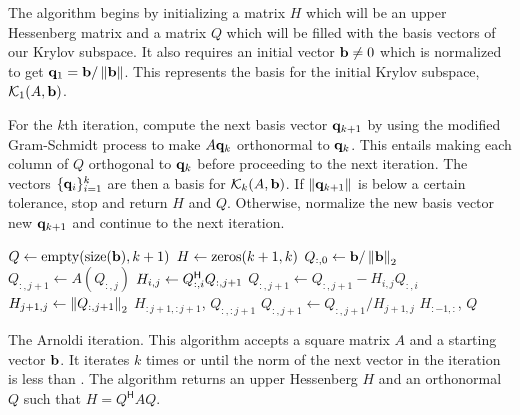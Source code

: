 The algorithm begins by initializing a matrix $H$ which will be an upper Hessenberg matrix and a matrix $Q$ which will be filled with the basis vectors of our Krylov subspace.
It also requires an initial vector $\mathbf{b} \neq 0$ which is normalized to get $\mathbf{q}_1 = \mathbf{b}/\left\lVert\mathbf{b}\right\rVert$.
This represents the basis for the initial Krylov subspace, $\mathcal{K}_1(A,\mathbf{b})$.

For the $k$th iteration, compute the next basis vector $\mathbf{q}_{k+1}$ by using the modified Gram-Schmidt process to make $A\mathbf{q}_k$ orthonormal to $\mathbf{q}_k$.
This entails making each column of $Q$ orthogonal to $\mathbf{q}_k$ before proceeding to the next iteration.
The vectors $\{\mathbf{q}_i\}_{i=1}^k$ are then a basis for $\mathcal{K}_k(A,\mathbf{b})$.
If $\left\lVert\mathbf{q}_{k+1}\right\rVert$ is below a certain tolerance, stop and return $H$ and $Q$.
Otherwise, normalize the new basis vector new $\mathbf{q}_{k+1}$ and continue to the next iteration.


\begin{algorithm}
\begin{algorithmic}[1]
	\State $Q \gets \allocate{\size{\b}}{k+1}$			
	\State $H \gets \zeros{ k+1}{ k}$
	\State $Q_{:,0} \gets \mathbf{b}/\left\lVert\mathbf{b}\right\rVert_2$
								
		\State $Q_{:,j+1} \gets A(Q_{:,j})$
							
			\State $H_{i,j} \gets Q_{:,i}^{\mathsf H} Q_{:,j+1}$
			\State $Q_{:,j+1} \gets Q_{:,j+1} - H_{i,j} Q_{:,i}$
		\EndFor
		\State $H_{j+1,j} \gets \left\lVert Q_{:,j+1}\right\rVert_2$			
            					
			\State {} $H_{:j+1,:j+1}$, $Q_{:,:j+1}$
		\EndIf
		\State $Q_{:,j+1} \gets Q_{:,j+1}/H_{j+1,j}$				
	\EndFor
	\State {} $H_{:-1, :}$, $Q$			
\EndProcedure
\end{algorithmic}
\caption{The Arnoldi iteration.
This algorithm accepts a square matrix $A$ and a starting vector $\mathbf{b}$.
It iterates $k$ times or until the norm of the next vector in the iteration is less than .
The algorithm returns an upper Hessenberg $H$ and an orthonormal $Q$ such that $H = Q^{\mathsf{H}}AQ$.}
\label{alg:arnoldi_iteration}
\end{algorithm}

